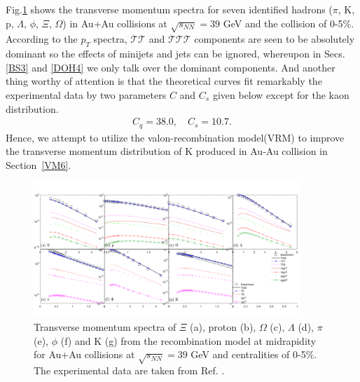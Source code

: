 \documentclass[twocolumn,aps,superscriptaddress,showpacs,nofootinbib,floatfix]{revtex4}
\def\eq{{\,=\,}}
\def\bq{\begin{eqnarray}}
\def\eq{\end{eqnarray}}
\begin{document}
Fig.\ref{fig1} shows the transverse momentum spectra for seven identified hadrons ($\pi$, K, p, $\Lambda$, $\phi$, $\Xi$, $\Omega$) in Au+Au collisions at $\sqrt{s_{NN}}=39$ GeV and the collision of 0-5\%. According to the $p_T$ spectra, $\mathcal{TT}$ and $\mathcal{TTT}$ components are seen to be absolutely dominant so the effects of minijets and jets can be ignored, whereupon in Secs. \ref{BS3} and \ref{DOH4} we only talk over the dominant components. And another thing worthy of attention is that the theoretical curves fit remarkably the experimental data by two parameters $C$ and $C_s$ given below except for the kaon distribution. 
\bq
C_{q}=38.0, \quad C_{s}=10.7. \label{2.10} 
\eq
Hence, we attempt to utilize the valon-recombination model(VRM) to improve the transverse momentum distribution of K produced in Au-Au collision in Section~\ref{VM6}.
\begin{figure}[pht]
  \includegraphics[width=0.9\textwidth]{pic1.png}
  \caption{Transverse momentum spectra of $\Xi$ (a), proton (b), $\Omega$ (c), $\Lambda$ (d), $\pi$ (e), $\phi$ (f) and K (g) from the recombination model at midrapidity for Au+Au collisions at $\sqrt{s_{NN}}=39$ GeV and centralities of 0-5\%. The experimental data are taken from Ref. \cite{STAR:2019bjj,STAR:2017sal,STAR:2015vvs}.}
\label{fig1}
\end{figure}
\end{document}

